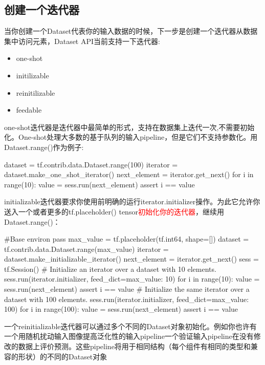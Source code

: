 \subsection{创建一个迭代器}
当你创建一个Dataset代表你的输入数据的时候，下一步是创建一个迭代器从数据集中访问元素，Dataset API当前支持一下迭代器:
\begin{itemize}
	\item one-shot
	\item initilizable
	\item reinitilizable
	\item feedable
\end{itemize}
one-shot迭代器是迭代器中最简单的形式，支持在数据集上迭代一次,不需要初始化。One-shot处理大多数的基于队列的输入pipeline，但是它们不支持参数化。用Dataset.range()作为例子:
\begin{python}
dataset = tf.contrib.data.Dataset.range(100)
iterator = dataset.make_one_shot_iterator()
next_element = iterator.get_next()
for i in range(10):
    value = sess.run(next_element)
    assert i == value
\end{python}
initializable迭代器要求你使用前明确的运行iterator.initializer操作。为此它允许你送入一个或者更多的tf.placeholder() tensor\textcolor{red}{初始化你的迭代器}，继续用Dataset.range()：
\begin{python}
#Base environ pass
max_value = tf.placeholder(tf.int64, shape=[])
dataset = tf.contrib.data.Dataset.range(max_value)
iterator = dataset.make_initializable_iterator()
next_element = iterator.get_next()
sess = tf.Session()
# Initialize an iterator over a dataset with 10 elements.
sess.run(iterator.initializer, feed_dict={max_value: 10})
for i in range(10):
    value = sess.run(next_element)
    assert i == value
# Initialize the same iterator over a dataset with 100 elements.
sess.run(iterator.initializer, feed_dict={max_value: 100})
for i in range(100):
    value = sess.run(next_element)
    assert i == value
\end{python}
一个reinitializable迭代器可以通过多个不同的Dataset对象初始化。例如你也许有一个用随机扰动输入图像提高泛化性的输入pipeline一个验证输入pipeline在没有修改的数据上评价预测。这些pipeline将用于相同结构（每个组件有相同的类型和兼容的形状）的不同的Dataset对象
